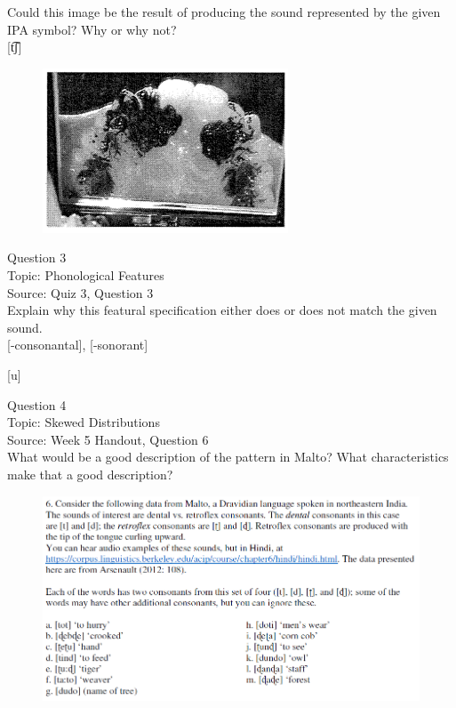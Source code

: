 \documentclass[12pt]{article}
\begin{document}
Could this image be the result of producing the sound represented by the given IPA symbol? Why or why not?\\

{[t͡ʃ]}

\begin{figure}[H]
\includegraphics{../images/staticpalatography_fricative.png}
\end{figure}

\newpage

{\large Question 3}\\

Topic: Phonological Features\\
Source: Quiz 3, Question 3\\

Explain why this featural specification either does or does not match the given sound.\\

{[-consonantal]}, {[-sonorant]}

{[u]}


\newpage

{\large Question 4}\\

Topic: Skewed Distributions\\
Source: Week 5 Handout, Question 6\\

What would be a good description of the pattern in Malto? What characteristics make that a good description?\\

\begin{figure}[H]
\includegraphics{../images/malto.png}
\end{figure}
\end{document}
